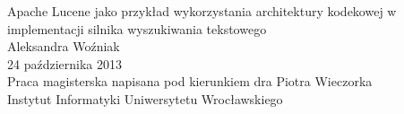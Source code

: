 \begin{titlepage}

\begin{spacing}{2}

\begin{center}
 \vspace*{5cm}
 {\LARGE Apache Lucene jako przykład wykorzystania architektury kodekowej w implementacji silnika wyszukiwania tekstowego}
 \\[0.75cm]
 {\Large Aleksandra Woźniak}
 \\[0.3cm]
 {\large 24 października 2013}
 \\[2.5cm]
 {\large Praca magisterska napisana pod kierunkiem dra Piotra Wieczorka
 \\
 Instytut Informatyki Uniwersytetu Wrocławskiego}

\end{center}

\end{spacing}

\end{titlepage}